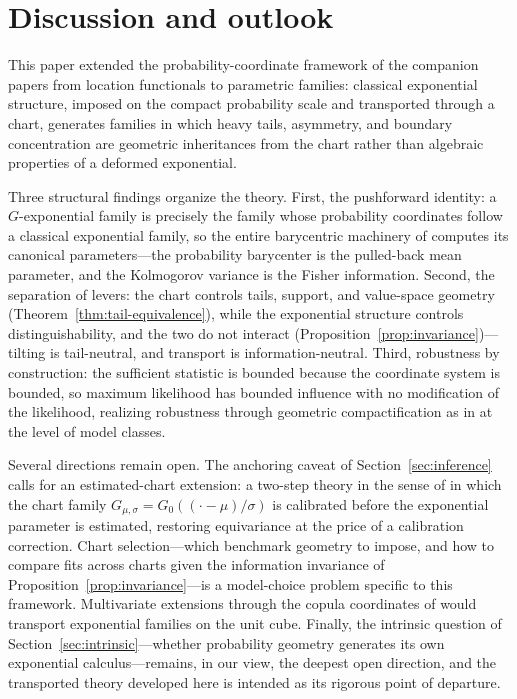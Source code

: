 \documentclass[11pt]{article}
\theoremstyle{definition}
\begin{document}
\section{Discussion and outlook}\label{sec:discussion}

This paper extended the probability-coordinate framework of the companion
papers from location functionals to parametric families: classical
exponential structure, imposed on the compact probability scale and
transported through a chart, generates families in which heavy tails,
asymmetry, and boundary concentration are geometric inheritances from the
chart rather than algebraic properties of a deformed exponential.

Three structural findings organize the theory. First, the pushforward
identity: a $G$-exponential family is precisely the family whose
probability coordinates follow a classical exponential family, so the
entire barycentric machinery of \cite{Cojocea2026a} computes its canonical
parameters---the probability barycenter is the pulled-back mean parameter,
and the Kolmogorov variance is the Fisher information. Second, the
separation of levers: the chart controls tails, support, and value-space
geometry (Theorem~\ref{thm:tail-equivalence}), while the exponential
structure controls distinguishability, and the two do not interact
(Proposition~\ref{prop:invariance})---tilting is tail-neutral, and
transport is information-neutral. Third, robustness by construction: the
sufficient statistic is bounded because the coordinate system is bounded,
so maximum likelihood has bounded influence with no modification of the
likelihood, realizing robustness through geometric compactification as in
\cite{Cojocea2026b} at the level of model classes.

Several directions remain open. The anchoring caveat of
Section~\ref{sec:inference} calls for an estimated-chart extension: a
two-step theory in the sense of \cite{Cojocea2026b} in which the chart
family $G_{\mu,\sigma}=G_0((\cdot-\mu)/\sigma)$ is calibrated before the
exponential parameter is estimated, restoring equivariance at the price of
a calibration correction. Chart selection---which benchmark geometry to
impose, and how to compare fits across charts given the information
invariance of Proposition~\ref{prop:invariance}---is a model-choice
problem specific to this framework. Multivariate extensions through the
copula coordinates of \cite{Cojocea2026a} would transport exponential
families on the unit cube. Finally, the intrinsic question of
Section~\ref{sec:intrinsic}---whether probability geometry generates its
own exponential calculus---remains, in our view, the deepest open
direction, and the transported theory developed here is intended as its
rigorous point of departure.
\end{document}
